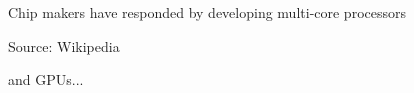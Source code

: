 \begin{frame}
    
    Chip makers have responded by developing multi-core processors

    \begin{figure}
       \begin{center}
       \end{center}
    \end{figure}

    Source: Wikipedia


\end{frame}


\begin{frame}
    
    and GPUs...

    \begin{figure}
       \begin{center}
       \end{center}
    \end{figure}


\end{frame}



